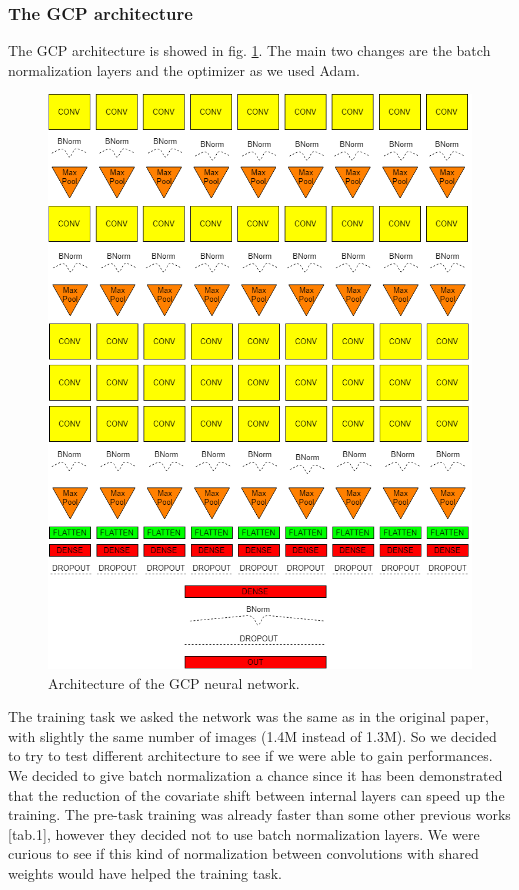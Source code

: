 \subsubsection{The GCP architecture}
The GCP architecture is showed in fig. \ref{fig:GCP_net}. The main two changes are the batch normalization layers and the optimizer as we used Adam.
\begin{figure}[!ht]
    \centering
    \includegraphics[scale=0.34]{images/GCP_net.png}
    \caption{Architecture of the GCP neural network.}
    \label{fig:GCP_net}
\end{figure}
The training task we asked the network was the same as in the original paper, with slightly the same number of images (1.4M instead of 1.3M). So we decided to try to test different architecture to see if we were able to gain performances.\newline
We decided to give batch normalization a chance since it has been demonstrated \cite{batch_norm_paper} that the reduction of the covariate shift between internal layers can speed up the training. The pre-task training was already faster than some other previous works \cite{Noroozi_2016}[tab.1], however they decided not to use batch normalization layers. We were curious to see if this kind of normalization between convolutions with shared weights would have helped the training task. \newline
